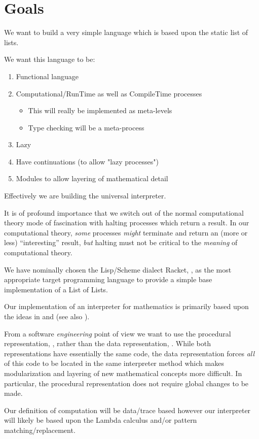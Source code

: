 
\section{Goals}

We want to build a very simple language which is based upon the static 
list of lists.

We want this language to be:
\begin{enumerate}
\item Functional language
\item Computational/RunTime as well as CompileTime processes
  \begin{itemize}
  \item This will really be implemented as meta-levels
  \item Type checking will be a meta-process
  \end{itemize}
\item Lazy
\item Have continuations (to allow "lazy processes")
\item Modules to allow layering of mathematical detail
\end{enumerate}

Effectively we are building the universal interpreter.

It is of profound importance that we switch out of the normal computational
theory mode of fascination with halting processes which return a result.  In our
computational theory, \emph{some} processes \emph{might} terminate and return an
(more or less) ``interesting'' result, \emph{but} halting must not be critical to the
\emph{meaning} of computational theory.

We have nominally chosen the Lisp/Scheme dialect Racket,
\cite{racket2016racket}, as the most appropriate target programming language to
provide a simple base implementation of a List of Lists.

Our implementation of an interpreter for mathematics is primarily based upon the
ideas in \cite{friedmanWand2008essentialsProgrammingLanguages} and
\cite{krishnamurthi2007programmingLanguagesApplicationInterpretation} (see also
\cite{krishnamurthi2012programmingLanguagesApplicationInterpretation}).

From a software \emph{engineering} point of view we want to use the procedural
representation, \cite[section
2.2.3]{friedmanWand2008essentialsProgrammingLanguages}, rather than the data
representation, \cite[section
2.2.2]{friedmanWand2008essentialsProgrammingLanguages}. While both
representations have essentially the same code, the data representation forces
\emph{all} of this code to be located in the same interpreter method which makes
modularization and layering of new mathematical concepts more difficult. In
particular, the procedural representation does not require global changes to be
made.

Our definition of computation will be data/trace based however our interpreter
will likely be based upon the Lambda calculus and/or pattern
matching/replacement. 
